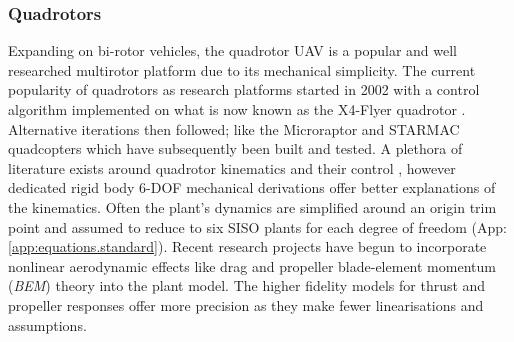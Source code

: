 \subsubsection*{Quadrotors}
Expanding on bi-rotor vehicles, the quadrotor UAV is a popular and well researched multirotor platform due to its mechanical simplicity. The current popularity of quadrotors as research platforms started in 2002 with a control algorithm implemented on what is now known as the X4-Flyer quadrotor \cite{x4flyer,x4flyercontrol}. Alternative iterations then followed; like the Microraptor\cite{microraptor} and STARMAC\cite{starmac} quadcopters which have subsequently been built and tested. A plethora of literature exists around quadrotor kinematics and their control \cite{dynamicmodelling2013, quaddynamics, fullquadcoptercontrol}, however dedicated rigid body 6-DOF mechanical derivations \cite{rigidbodylecture,eulerrigidbody} offer better explanations of the kinematics. Often the plant's dynamics are simplified around an origin trim point and assumed to reduce to six SISO plants for each degree of freedom (App:\ref{app:equations.standard}). Recent research projects have begun to incorporate nonlinear aerodynamic effects like drag and propeller blade-element momentum (\emph{BEM}) theory into the plant model\cite{lowreynolds,bem,starmac,nonlineardynamics}. The higher fidelity models for thrust and propeller responses offer more precision as they make fewer linearisations and assumptions.
\par

